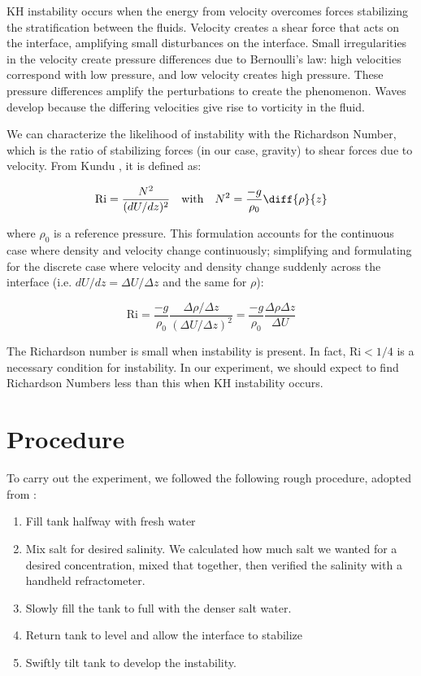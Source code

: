 \documentclass{article}
\begin{document}
KH instability occurs when the energy from velocity overcomes forces stabilizing
the stratification between the fluids. Velocity creates a shear force that acts
on the interface, amplifying small disturbances on the interface. Small
irregularities in the velocity create pressure differences due to Bernoulli's
law: high velocities correspond with low pressure, and low velocity creates high
pressure. These pressure differences amplify the perturbations to create the
phenomenon. Waves develop because the differing velocities give rise to
vorticity in the fluid.

We can characterize the likelihood of instability with the Richardson Number,
which is the ratio of stabilizing forces (in our case, gravity) to shear forces
due to velocity. From Kundu \cite{kundu}, it is defined as:

\[ \text{Ri} = \frac{N^2}{(dU/dz)^2} \quad\text{with}\quad N^2 = \frac{-g}{\rho_0} \diff{\rho}{z} \]

where \(\rho_0\) is a reference pressure. This formulation accounts for the continuous case where density and velocity change continuously; simplifying and formulating for the discrete case where velocity and density change suddenly across the interface (i.e. \(dU/dz = \Delta U / \Delta z\) and the same for \(\rho\)):

\[ \text{Ri} = \frac{-g}{\rho_0} \frac{\Delta \rho / \Delta z}{(\Delta U / \Delta z)^2} = \frac{-g}{\rho_0} \frac{\Delta \rho \Delta z}{\Delta U}\]

The Richardson number is small when instability is present. In fact, \(\text{Ri}
< 1/4\) is a necessary condition for instability. In our experiment, we should
expect to find Richardson Numbers less than this when KH instability occurs.

\section{Procedure}

To carry out the experiment, we followed the following rough procedure, adopted
from \cite{kh-instability-demo}:

\begin{enumerate}
    \item Fill tank halfway with fresh water
    \item Mix salt for desired salinity. We calculated how much salt we wanted
    for a desired concentration, mixed that together, then verified the salinity
    with a handheld refractometer.
    \item Slowly fill the tank to full with the denser salt water.
    \item Return tank to level and allow the interface to stabilize
    \item Swiftly tilt tank to develop the instability.
\end{enumerate}
\end{document}
